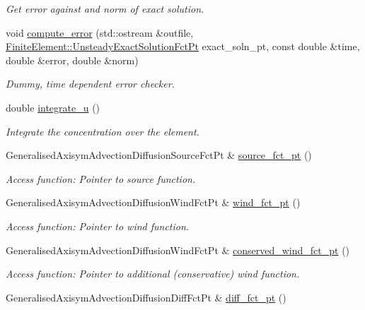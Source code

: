\begin{DoxyCompactItemize}
\begin{DoxyCompactList}\small\item\em Get error against and norm of exact solution. \end{DoxyCompactList}\item 
void \hyperlink{namespaceoomph_ac84166e8fd13dcb55670244c618a2bab}{compute\+\_\+error} (std\+::ostream \&outfile, \hyperlink{classoomph_1_1FiniteElement_ad4ecf2b61b158a4b4d351a60d23c633e}{Finite\+Element\+::\+Unsteady\+Exact\+Solution\+Fct\+Pt} exact\+\_\+soln\+\_\+pt, const double \&time, double \&error, double \&norm)
\begin{DoxyCompactList}\small\item\em Dummy, time dependent error checker. \end{DoxyCompactList}\item 
double \hyperlink{namespaceoomph_a816fb1d612ecf4c4f42cecc69d5c636f}{integrate\+\_\+u} ()
\begin{DoxyCompactList}\small\item\em Integrate the concentration over the element. \end{DoxyCompactList}\item 
Generalised\+Axisym\+Advection\+Diffusion\+Source\+Fct\+Pt \& \hyperlink{namespaceoomph_aaeb31b697ac413871cfe74e70c3a60b1}{source\+\_\+fct\+\_\+pt} ()
\begin{DoxyCompactList}\small\item\em Access function\+: Pointer to source function. \end{DoxyCompactList}\item 
Generalised\+Axisym\+Advection\+Diffusion\+Wind\+Fct\+Pt \& \hyperlink{namespaceoomph_a09679a76034a175cfc8a098dda6621c1}{wind\+\_\+fct\+\_\+pt} ()
\begin{DoxyCompactList}\small\item\em Access function\+: Pointer to wind function. \end{DoxyCompactList}\item 
Generalised\+Axisym\+Advection\+Diffusion\+Wind\+Fct\+Pt \& \hyperlink{namespaceoomph_a664dfd26d500b1a6af69253d6265366b}{conserved\+\_\+wind\+\_\+fct\+\_\+pt} ()
\begin{DoxyCompactList}\small\item\em Access function\+: Pointer to additional (conservative) wind function. \end{DoxyCompactList}\item 
Generalised\+Axisym\+Advection\+Diffusion\+Diff\+Fct\+Pt \& \hyperlink{namespaceoomph_a6dd5f52cf4ab589e9675a8b36fcc0e83}{diff\+\_\+fct\+\_\+pt} ()

\end{DoxyCompactItemize}
